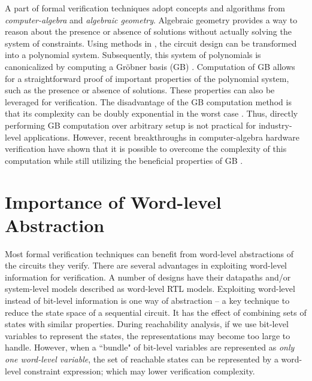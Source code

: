 A part of formal verification techniques adopt concepts and algorithms from 
\emph{computer-algebra} and \emph{algebraic geometry}.
Algebraic geometry provides a way to reason about the presence or absence of solutions 
without actually solving the system of constraints.
Using methods in \cite{Avrunin:CAV,condrat-tacas07,gbverify:2007,jinpeng,pruss:tcad15}, 
the circuit design can be transformed into a polynomial system. Subsequently, this system
of polynomials is canonicalized by computing a Gr\"obner basis (GB) \cite{gb_book}. 
Computation of GB allows for 
a straightforward proof of important properties of the polynomial system, 
such as the presence or absence of 
solutions. These properties can also be leveraged for 
verification. The disadvantage of the GB computation method is that its complexity can be doubly 
exponential in the worst case \cite{dube1986complexity}. Thus, directly performing GB computation 
over arbitrary setup is not practical for industry-level applications. However, recent
breakthroughs in computer-algebra hardware verification have shown
that it is possible to overcome the complexity of this computation while
still utilizing the beneficial properties of GB
\cite{lv:phd,tim:phd}.

\section{Importance of Word-level Abstraction}
Most formal verification techniques can benefit from word-level abstractions 
of the circuits they verify.
There are several advantages in exploiting word-level information for
verification. A number of designs have  their
datapaths and/or system-level models described as word-level RTL
models.  Exploiting word-level instead of bit-level information is one
way of abstraction -- a key technique to reduce the state space of a
sequential circuit. It has the effect of combining sets of states with similar 
properties. During reachability analysis, if we use bit-level
variables to  represent the states, the representations may become too
large to handle. However, when a ``bundle" of bit-level variables are
represented as {\it only one word-level variable}, the set of
reachable states can be represented by a  word-level constraint
expression; which may lower verification complexity.


